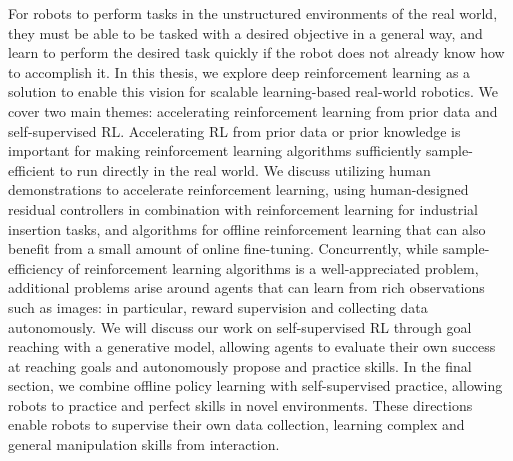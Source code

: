 For robots to perform tasks in the unstructured environments of the real world, they must be able to be tasked with a desired objective in a general way, and learn to perform the desired task quickly if the robot does not already know how to accomplish it.
In this thesis, we explore deep reinforcement learning as a solution to enable this vision for scalable learning-based real-world robotics. We cover two main themes: accelerating reinforcement learning from prior data and self-supervised RL.
Accelerating RL from prior data or prior knowledge is important for making reinforcement learning algorithms sufficiently sample-efficient to run directly in the real world.
We discuss utilizing human demonstrations to accelerate reinforcement learning, using human-designed residual controllers in combination with reinforcement learning for industrial insertion tasks, and algorithms for offline reinforcement learning that can also benefit from a small amount of online fine-tuning.
Concurrently, while sample-efficiency of reinforcement learning algorithms is a well-appreciated problem, additional problems arise around agents that can learn from rich observations such as images: in particular, reward supervision and collecting data autonomously.
We will discuss our work on self-supervised RL through goal reaching with a generative model, allowing agents to evaluate their own success at reaching goals and autonomously propose and practice skills.
In the final section, we combine offline policy learning with self-supervised practice, allowing robots to practice and perfect skills in novel environments.
These directions enable robots to supervise their own data collection, learning complex and general manipulation skills from interaction.